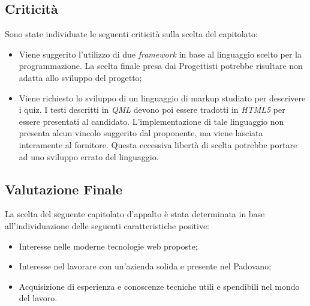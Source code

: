 \subsection{Criticità}
Sono state individuate le seguenti criticità sulla scelta del capitolato:
\begin{itemize}
\item Viene suggerito l'utilizzo di due \textit{framework} in base al linguaggio scelto per la programmazione. La scelta finale presa dai Progettisti potrebbe risultare non adatta allo sviluppo del progetto;
\item Viene richiesto lo sviluppo di un linguaggio di markup studiato per descrivere i quiz. I testi descritti in \textit{QML} devono poi essere tradotti in \textit{HTML5} per essere presentati al candidato. L'implementazione di tale linguaggio non presenta alcun vincolo suggerito dal proponente, ma viene lasciata interamente al fornitore. Questa eccessiva libertà di scelta potrebbe portare ad uno sviluppo errato del linguaggio.
\end{itemize}

\subsection{Valutazione Finale}
La scelta del seguente capitolato d'appalto è stata determinata in base all'individuazione delle seguenti caratteristiche positive:
\begin{itemize} 
\item Interesse nelle moderne tecnologie web proposte;
\item Interesse nel lavorare con un'azienda solida e presente nel Padovano;
\item Acquisizione di esperienza e conoscenze tecniche utili e spendibili nel mondo del lavoro.
\end{itemize}
